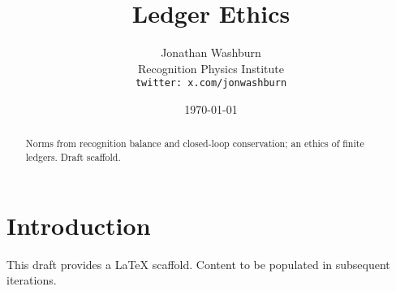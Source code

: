 \documentclass[11pt,letterpaper]{article}
\title{Ledger Ethics}
\author{Jonathan Washburn\\Recognition Physics Institute\\\texttt{twitter: x.com/jonwashburn}}
\date{\today}
\begin{document}
\maketitle
\begin{abstract}
Norms from recognition balance and closed-loop conservation; an ethics of finite ledgers. Draft scaffold.
\end{abstract}
\section{Introduction}
This draft provides a LaTeX scaffold. Content to be populated in subsequent iterations.
\end{document}
